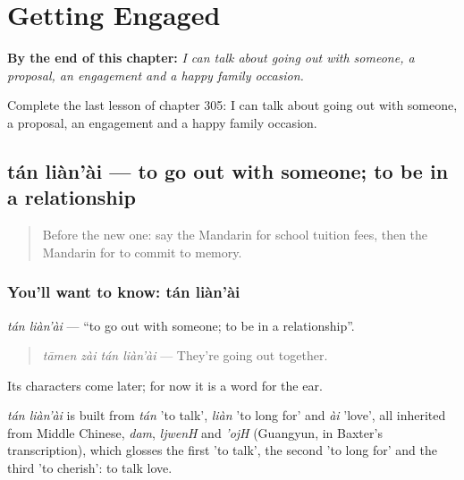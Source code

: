 
\chapter{Getting Engaged}
\label{ch:zh-getting-engaged}

\begin{chapteropening}
\textbf{By the end of this chapter:} \emph{I can talk about going out with someone, a proposal, an engagement and a happy family occasion.}

Complete the last lesson of chapter 305: I can talk about going out with someone, a proposal, an engagement and a happy family occasion.
\end{chapteropening}

\section[tán liàn'ài]{tán liàn'ài — to go out with someone; to be in a relationship}

\label{lesson:ZH-C305-tanlianai}



\begin{quote}
Before the new one: say the Mandarin for school tuition fees, then the Mandarin for to commit to memory.
\end{quote}

\subsection*{You'll want to know: tán liàn'ài}
\emph{tán liàn'ài} — \textquotedblleft{}to go out with someone; to be in a relationship\textquotedblright{}.

\begin{quote}
\emph{tāmen zài tán liàn'ài} — They're going out together.
\end{quote}

Its characters come later; for now it is a word for the ear.

\begin{cousinweb}
\emph{tán liàn'ài} is built from \emph{tán} 'to talk', \emph{liàn} 'to long for' and \emph{ài} 'love', all inherited from Middle Chinese, \emph{dam}, \emph{ljwenH} and \emph{'ojH} (Guangyun, in Baxter's transcription), which glosses the first 'to talk', the second 'to long for' and the third 'to cherish': to talk love.
\end{cousinweb}

